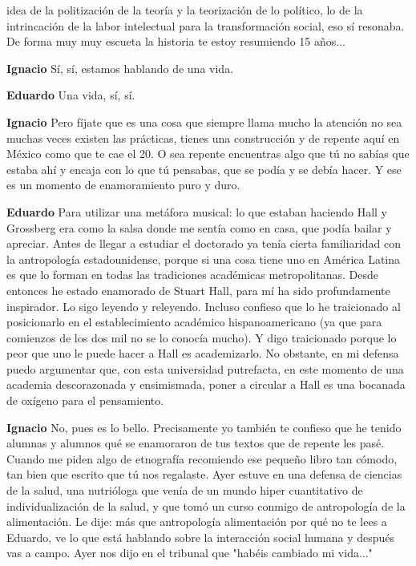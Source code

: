 \documentclass[
  spanish,
  11pt,
  a4paper,
]{scrbook}
\newenvironment{transcripcion}{
    \begin{list}{}{
        \setlength{\leftmargin}{1.5em}  %
        \setlength{\rightmargin}{0em}
        \setlength{\itemsep}{0.2em}     %
        \setlength{\parsep}{0.0em}
        \setlength{\listparindent}{0pt}
    }
}{
    \end{list}
}
\newcommand{\personaje}[1]{\textbf{#1}\quad}
\begin{document}
\begin{transcripcion}
idea de la politización de la teoría y la teorización de lo político, lo de la intrincación de la labor intelectual para la transformación social, eso sí resonaba. De forma muy muy escueta la historia te estoy resumiendo 15 años...

\item \personaje{Ignacio} Sí, sí, estamos hablando de una vida.

\item \personaje{Eduardo} Una vida, sí, sí.

\item \personaje{Ignacio} Pero fíjate que es una cosa que siempre llama mucho la atención no sea muchas veces existen las prácticas, tienes una construcción y de repente aquí en México como que te cae el 20. O sea repente encuentras algo que tú no sabías que estaba ahí y encaja con lo que tú pensabas, que se podía y se debía hacer. Y ese es un momento de enamoramiento puro y duro.

\item \personaje{Eduardo} Para utilizar una metáfora musical: lo que estaban haciendo Hall y Grossberg era como la salsa donde me sentía como en casa, que podía bailar y apreciar. Antes de llegar a estudiar el doctorado ya tenía cierta familiaridad con la antropología estadounidense, porque si una cosa tiene uno en América Latina es que lo forman en todas las tradiciones académicas metropolitanas. Desde entonces he estado enamorado de Stuart Hall, para mí ha sido profundamente inspirador. Lo sigo leyendo y releyendo. Incluso confieso que lo he traicionado al posicionarlo en el establecimiento académico hispanoamericano (ya que para comienzos de los dos mil no se lo conocía mucho). Y digo traicionado porque lo peor que uno le puede hacer a Hall es academizarlo. No obstante, en mi defensa puedo argumentar que, con esta universidad putrefacta, en este momento de una academia descorazonada y ensimismada, poner a circular a Hall es una bocanada de oxígeno para el pensamiento.

\item \personaje{Ignacio} No, pues es lo bello. Precisamente yo también te confieso que he tenido alumnas y alumnos qué se enamoraron de tus textos que de repente les pasé. Cuando me piden algo de etnografía recomiendo ese pequeño libro tan cómodo, tan bien que escrito que tú nos regalaste. Ayer estuve en una defensa de ciencias de la salud, una nutrióloga que venía de un mundo hiper cuantitativo de individualización de la salud, y que tomó un curso conmigo de antropología de la alimentación. Le dije: más que antropología alimentación por qué no te lees a Eduardo, ve lo que está hablando sobre la interacción social humana y después vas a campo. Ayer nos dijo en el tribunal que "habéis cambiado mi vida..."


\end{transcripcion}
\end{document}
